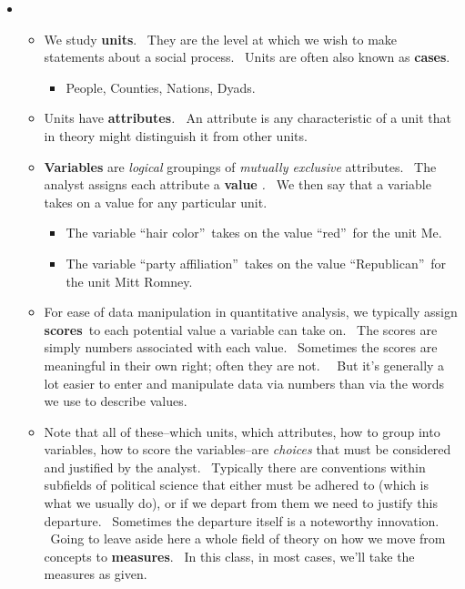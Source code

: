 \documentclass[11pt]{article}
\begin{document}
\begin{itemize}
\item 
\begin{itemize}
\item We study \textbf{units}. \ They are the level at which we wish to make
statements about a social process. \ Units are often also known as \textbf{%
cases}.

\begin{itemize}
\item People, Counties, Nations, Dyads.
\end{itemize}

\item Units have \textbf{attributes}\textit{. \ }An attribute is any
characteristic of a unit that in theory might distinguish it from other
units. \ 

\item \textbf{Variables} are \textit{logical }groupings of \textit{mutually
exclusive }attributes. \ The analyst assigns each attribute a \textbf{value}%
\textit{. \ }We then say that a variable takes on a value for any particular
unit. \ 

\begin{itemize}
\item The variable \textquotedblleft hair color\textquotedblright\ takes on
the value \textquotedblleft red\textquotedblright\ for the unit Me. \ 

\item The variable \textquotedblleft party affiliation\textquotedblright\
takes on the value \textquotedblleft Republican\textquotedblright\ for the
unit Mitt Romney.
\end{itemize}

\item For ease of data manipulation in quantitative analysis, we typically
assign \textbf{scores}\textit{\ }to each potential value a variable can take
on. \ The scores are simply numbers associated with each value. \ Sometimes
the scores are meaningful in their own right; often they are not. \ \ But
it's generally a lot easier to enter and manipulate data via numbers than
via the words we use to describe values.

\item Note that all of these--which units, which attributes, how to group
into variables, how to score the variables--are \textit{choices }that must
be considered and justified by the analyst. \ Typically there are
conventions within subfields of political science that either must be
adhered to (which is what we usually do), or if we depart from them we need
to justify this departure. \ Sometimes the departure itself is a noteworthy
innovation. \ Going to leave aside here a whole field of theory on how we
move from concepts to \textbf{measures}. \ In this class, in most cases,
we'll take the measures as given.
\end{itemize}
\end{itemize}
\end{document}
